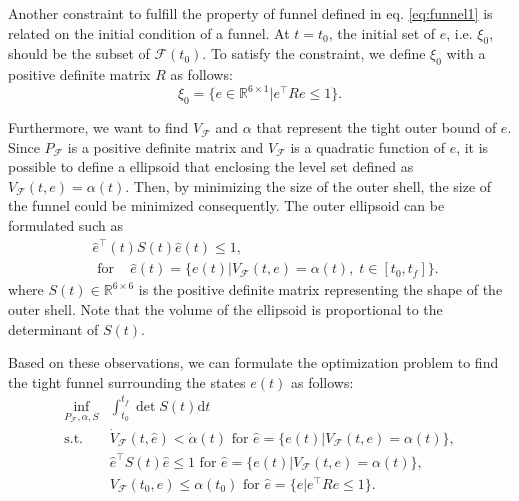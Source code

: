\documentclass[letterpaper, 10 pt, conference]{ieeeconf}  %
\begin{document}
Another constraint to fulfill the property of funnel defined in eq. \eqref{eq:funnel1} is related on the initial condition of a funnel. 
At $t = t_0$, the initial set of $e$, i.e. $\xi_0$, should be the subset of $\mathcal{F}(t_0)$. 
To satisfy the constraint, we define $\xi_0$ with a positive definite matrix $R$ as follows:
\begin{equation}
\xi_0 = \{e \in \mathbb{R}^{6\times1}|e^\intercal R e \leq 1\}.
\end{equation} 

Furthermore, we want to find $V_\mathcal{F}$ and $\alpha$ that represent the tight outer bound of $e$. 
Since $P_\mathcal{F}$ is a positive definite matrix and $V_\mathcal{F}$ is a quadratic function of $e$, 
it is possible to define a ellipsoid that enclosing the level set defined as $V_\mathcal{F}(t,e) = \alpha(t)$.
Then, by minimizing the size of the outer shell, the size of the funnel could be minimized consequently.
The outer ellipsoid can be formulated such as
\begin{align}
&\hat{e}^\intercal(t) S(t) \hat{e}(t) \leq 1,  \nonumber \\
&\text{ for }\;\;\;\hat{e}(t) = \{e(t)|V_\mathcal{F}(t,e) = \alpha(t),\;t \in [t_0,t_f]\}. \nonumber
\end{align}
where $S(t)\in \mathbb{R}^{6\times 6}$ is the positive definite matrix representing the shape of the outer shell. Note that the volume of the ellipsoid is proportional to the determinant of $S(t)$.

Based on these observations, we can formulate the optimization problem to find the tight funnel surrounding the states $e(t)$ as follows:
\begin{equation}
\begin{array}{rl}
\displaystyle{\inf_{P_\mathcal{F},\alpha,S}} & \int_{t_0}^{t_f} \det{S(t)}\text{d}t \label{eq:optim1} \\
\displaystyle{\text{s.t.}}& \dot{V}_\mathcal{F}(t,\hat{e}) < \dot{\alpha}(t)\text{ for }\hat{e} = \{e(t)|V_\mathcal{F}(t,e) = \alpha(t)\}, \nonumber \\
& \hat{e}^\intercal S(t) \hat{e} \leq 1\text{ for }\hat{e} = \{e(t)|V_\mathcal{F}(t,e) = \alpha(t)\}, \nonumber \\
& V_\mathcal{F}(t_0,\hat{e}) \leq \alpha(t_0)\text{ for }\hat{e} = \{e|e^\intercal R e \leq 1\}. \nonumber
\end{array}
\end{equation}
\end{document}
